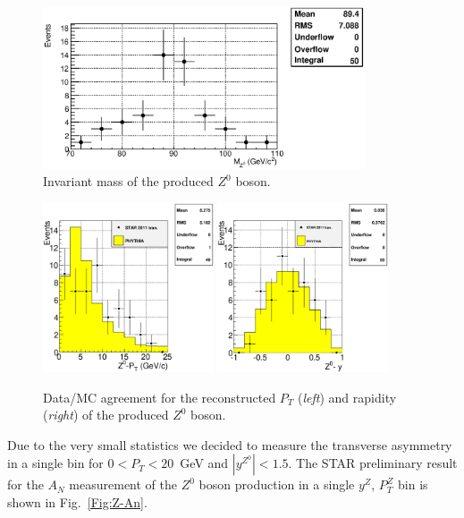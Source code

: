\documentclass[12pt]{article}
\begin{document}
\begin{figure}[htbp]
  \centering
  \includegraphics[width=0.85\textwidth]{images/Z_kinematics/Z0_plot_2}
  \caption{Invariant mass of the produced $Z^{0}$ boson.}
  \label{Fig:Z-M}
\end{figure}

\begin{figure}[htbp]
  \centering
  \includegraphics[width=0.45\textwidth]{images/Z_kinematics/plot_DataMc_Z0Pt}
  \includegraphics[width=0.45\textwidth]{images/Z_kinematics/plot_DataMc_Z0Rapidity}
  \caption{Data/MC agreement for the reconstructed $P_{T}$ ({\it left}) and rapidity ({\it right}) of the produced $Z^{0}$ boson.}
  \label{Fig:Z_kinem}
\end{figure}

Due to the very small statistics we decided to measure the transverse asymmetry in a single bin for $0 < P_{T} < 20$~GeV and $|y^{Z^{0}}| < 1.5$. 
The STAR preliminary result for the $A_{N}$ measurement of the $Z^{0}$ boson production in a single $y^{Z}$, $P_{T}^{Z}$ bin is shown in Fig.~\ref{Fig:Z-An}. 
\end{document}

